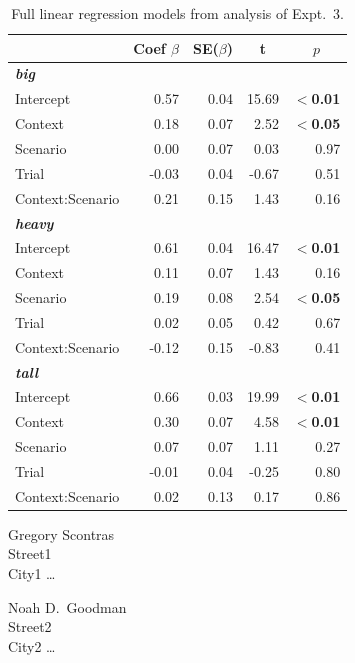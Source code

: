 \documentclass[linguex]{sp}
\begin{document}
\begin{table}[htb] 
	\centering \caption{Full linear regression models from analysis of Expt.~3.} \label{expt3analysis}
\begin{tabular}{lrrrr}\toprule
	&	Coef $\beta$	&	SE($\beta$)	&	\multicolumn{1}{c}{ \textbf{t}}	&	\multicolumn{1}{c}{$p$}\\ \midrule
\emph{\textbf{big}} \\
Intercept 			& 	0.57 &	0.04	&	15.69	&	\textbf{$<$0.01} \\
Context			&	0.18	&   0.07	&	2.52&	\textbf{$<$0.05} \\
Scenario			&	0.00&   0.07	&	0.03	&	0.97 \\
Trial				&	-0.03	&   0.04	&	-0.67	&	0.51 \\
Context:Scenario	&	0.21	&   0.15	&	1.43	&	0.16 \\ \hline
\emph{\textbf{heavy}}\\
Intercept 			& 	0.61 &	0.04	&	16.47	&	\textbf{$<$0.01} \\
Context			&	0.11	&   0.07	&	1.43	&	0.16\\
Scenario			&	0.19&   0.08	&	2.54	&	\textbf{$<$0.05}  \\
Trial				&	0.02	&   0.05	&	0.42&	0.67 \\
Context:Scenario	&	-0.12	&   0.15	&	-0.83	&	0.41 \\ \hline
\emph{\textbf{tall}}\\
Intercept 			& 	0.66 &	0.03	&	19.99	&	\textbf{$<$0.01} \\
Context			&	0.30	&   0.07	&	4.58&	\textbf{$<$0.01} \\
Scenario			&	0.07&   0.07	&	1.11	&	0.27 \\
Trial				&	-0.01	&   0.04	&	-0.25	&	0.80 \\
Context:Scenario	&	0.02	&   0.13	&	0.17	&	0.86 \\ 
\bottomrule
\end{tabular}
\end{table}


%


\begin{addresses}
	\begin{address}
		Gregory Scontras \\
		Street1 \\
		City1 \ldots \\
	\end{address}
	\begin{address}
		Noah D.~Goodman \\
		Street2 \\
		City2 \dots \\
		\email{author2@email}
	\end{address}
\end{addresses}
\end{document}
